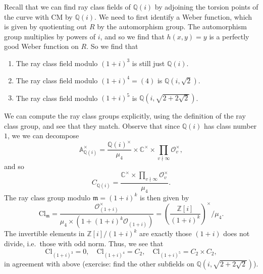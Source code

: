 \documentclass{shortart}
\theoremstyle{definition}
\newcommand\A{\mathbb{A}}
\newcommand\C{\mathbb{C}}
\newcommand\Z{\mathbb{Z}}
\newcommand\Q{\mathbb{Q}}
\newcommand\Cl{\mathrm{Cl}}
\begin{document}
Recall that we can find ray class fields of $\Q(i)$ by adjoining the torsion points of the curve with CM by $\Q(i)$. We need to first identify a Weber function, which is given by quotienting out $R$ by the automorphism group. The automorphism group multiplies by powers of $i$, and so we find that $h(x, y) = y$ is a perfectly good Weber function on $R$. So we find that
\begin{enumerate}
  \item The ray class field modulo $(1 + i)^3$ is still just $\Q(i)$.
  \item The ray class field modulo $(1 + i)^4 = (4)$ is $\Q(i, \sqrt{2})$.
  \item The ray class field modulo $(1 + i)^5$ is $\Q(i, \sqrt{2 + 2 \sqrt{2}})$.
\end{enumerate}
We can compute the ray class groups explicitly, using the definition of the ray class group, and see that they match. Observe that since $\Q(i)$ has class number $1$, we we can decompose
\[
  \A_{\Q(i)}^\times = \frac{\Q(i)^\times}{\mu_4} \times \C^\times \times \prod_{v \nmid \infty} \mathcal{O}_v^\times,
\]
and so
\[
  C_{\Q(i)} = \frac{\C^\times \times \prod_{v \nmid \infty} \mathcal{O}_v^\times}{\mu_4}.
\]
The ray class group modulo $\mathfrak{m} = (1 + i)^k$ is then given by
\[
  \Cl_\mathfrak{m} = \frac{\mathcal{O}_{(1 + i)}^\times}{\mu_4 \times (1 + (1 + i)^k \mathcal{O}_{(1 + i)})} = \left(\frac{\Z[i]}{(1 + i)^k}\right)^\times \Big/ \mu_4.
\]
The invertible elements in $\Z[i]/(1 + i)^k$ are exactly those $(1 + i)$ does not divide, i.e.\ those with odd norm. Thus, we see that
\[
  \Cl_{(1 + i)^3} = 0,\quad \Cl_{(1 + i)^4} = C_2,\quad \Cl_{(1 + i)^5} = C_2 \times C_2,
\]
in agreement with above (exercise: find the other subfields on $\Q(i, \sqrt{2 + 2\sqrt{2}})$).
\end{document}
